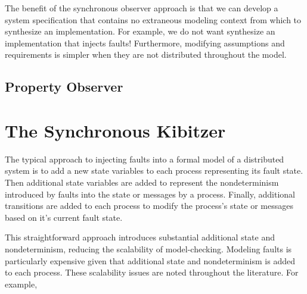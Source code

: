 \documentclass{IEEEtran/IEEEtran}
\newcommand{\lee}[1]{ } %
\newcommand{\lee}[1]{ {\color{blue}$<$lee: #1$>$} } %
\begin{document}
The benefit of the synchronous observer approach is that we can develop a system specification that contains no extraneous modeling context from which to synthesize an implementation. For example, we do not want synthesize an implementation that injects faults! Furthermore, modifying assumptions and requirements is simpler when they are not distributed throughout the model.






\subsection{Property Observer}


\section{The Synchronous Kibitzer}\label{sec:kibitzer}
The typical approach to injecting faults into a formal model of a distributed system is to add a new state variables to each process representing its fault state. Then additional state variables are added to represent the nondeterminism introduced by faults into the state or messages by a process. Finally, additional transitions are added to each process to modify the process's state or messages based on it's current fault state.

This straightforward approach introduces substantial additional state and nondeterminism, reducing the scalability of model-checking. Modeling faults is particularly expensive given that additional state and nondeterminism is added to each process. These scalability issues are noted throughout the literature. For example, \lee{TTA startup paper, helmut's paper, etc.}
\end{document}
